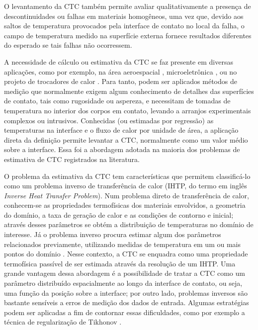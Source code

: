 O levantamento da CTC também permite avaliar qualitativamente a presença de descontinuidades ou falhas
em materiais homogêneos, uma vez que, devido aos saltos de temperatura provocados pela interface de contato no local da falha,
o campo de temperatura medido na superfície externa fornece resultados diferentes do esperado se tais falhas não ocorressem.

A necessidade de cálculo ou estimativa da CTC se faz presente em diversas aplicações, como por exemplo, na área aeroespacial \citep{artigo_aerospacial}, microeletrônica
\citep{artigo_snaith}, ou no projeto de trocadores de calor \citep{artigo_huang}. Para tanto, podem ser aplicados métodos de medição que normalmente exigem
algum conhecimento de detalhes das superfícies de contato, tais como rugosidade ou aspereza, e necessitam de tomadas de temperatura no interior dos corpos em contato, levando a arranjos
experimentais complexos ou intrusivos. Conhecidas (ou estimadas por regressão) as temperaturas na interface e o fluxo de calor por unidade de área, a aplicação
direta da definição permite levantar a CTC, normalmente como um valor médio sobre a interface. Essa foi a abordagem adotada na maioria dos problemas de estimativa
de CTC registrados na literatura.

O problema da estimativa da CTC tem características que permitem classificá-lo como um problema inverso de transferência de calor (IHTP, do termo em inglês
\textit{Inverse Heat Transfer Problem}). Num problema direto de transferência de calor, conhecem-se as propriedades termofísicas dos materiais envolvidos, a geometria do domínio, 
a taxa de geração de calor e as
condições de contorno e inicial; através desses parâmetros se obtém a distribuição de temperaturas no domínio de interesse. Já o problema inverso procura
estimar algum dos parâmetros relacionados previamente, utilizando medidas de temperatura em um ou mais pontos do domínio \citep{livro_beck_2}.
Nesse contexto, a CTC se enquadra como uma propriedade termofísica passível de ser estimada através da resolução de um IHTP. Uma grande vantagem dessa
abordagem é a possibilidade de tratar a CTC como um parâmetro distribuído espacialmente ao longo da interface de contato, ou seja, uma função da posição sobre a interface; por outro lado, problemas
inversos são bastante sensíveis a erros de medição dos dados de entrada. Algumas estratégias podem ser aplicadas
a fim de contornar essas dificuldades, como por exemplo a técnica de regularização de Tikhonov \citep{livro_tikonov}.

